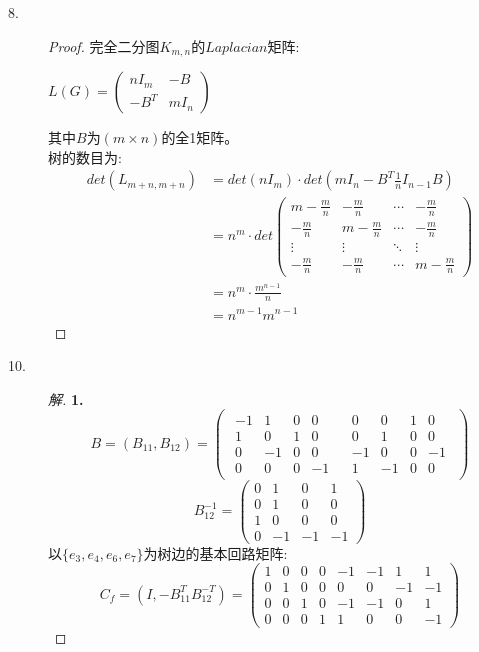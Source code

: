 \documentclass[UTF8, onecolumn, a4paper]{article}
\begin{document}
\begin{description}
\item[8.]
\begin{proof}
完全二分图$K_{m,n}$的$Laplacian$矩阵:
\begin{center}
	$L(G) = \begin{pmatrix}
	nI_m & -B\\
	-B^T & mI_n
	\end{pmatrix}$
\end{center}
其中$B$为$(m\times n)$的全1矩阵。\\
树的数目为:
\begin{equation}
\begin{aligned}
det(L_{m+n,m+n}) &= det\left(nI_m\right)\cdot det\left(mI_n - B^T\frac{1}{n}I_{n-1}B\right) \\&= n^m\cdot det
\begin{pmatrix}
m - \frac{m}{n} & -\frac{m}{n} & \cdots & -\frac{m}{n} \\
-\frac{m}{n} & m - \frac{m}{n} & \cdots & -\frac{m}{n}\\
\vdots & \vdots & \ddots & \vdots \\
-\frac{m}{n}& -\frac{m}{n} & \cdots& m - \frac{m}{n}
\end{pmatrix} \\&= n^m\cdot \frac{m^{n-1}}{n} \\&= n^{m-1}m^{n-1}
\end{aligned}
\end{equation}
\end{proof}

\item[10.]
\begin{proof}[解]
\textbf{1.}
$$B = (B_{11}, B_{12}) = 
\left(\begin{array}{c|c}
\begin{matrix}
-1& 1 &0 &0 \\
1& 0& 1& 0\\
0 &-1& 0& 0 \\
0 &0 &0 &-1
\end{matrix}&
\begin{matrix}
0 &0 &1 &0\\
0& 1& 0& 0\\
-1& 0 &0 &-1\\
1 &-1& 0 &0
\end{matrix}
\end{array}
\right)
$$
$$B_{12}^{-1} = 
\begin{pmatrix}
0& 1 &0 &1 \\
0 &1 &0 &0 \\
1& 0& 0& 0 \\
0& -1& -1& -1
\end{pmatrix}
$$
以$\{e_3,e_4,e_6,e_7\}$为树边的基本回路矩阵:
$$
C_f = (I, -B_{11}^TB_{12}^{-T}) = 
\begin{pmatrix}
1& 0 &0 &0 &-1& -1 &1 &1\\
0 &1 &0 &0 &0 &0 &-1& -1\\
0& 0& 1& 0 &-1& -1& 0& 1\\
0& 0& 0& 1& 1& 0& 0& -1
\end{pmatrix}
$$


\end{proof}
\end{description}
\end{document}

